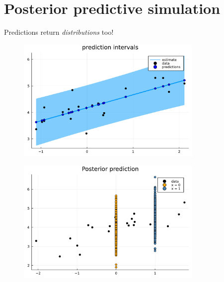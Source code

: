 \documentclass[aspectratio=169,xcolor=svgnames]{beamer}
\begin{document}
\section{Posterior predictive simulation}

\begin{frame}
  \huge
  \center
  Predictions return \emph{distributions} too!
\end{frame}

\begin{frame}
  \begin{figure}[ht]
    \centering
    \includegraphics[width=0.8\textwidth]{figures/linear_prediction_interval.pdf}
    \caption{\label{fig:label} }
  \end{figure}
\end{frame}

\begin{frame}
\begin{figure}[ht]
  \centering
  \includegraphics[width=0.8\textwidth]{figures/predictions.pdf}
\end{figure}
\end{frame}
\end{document}
